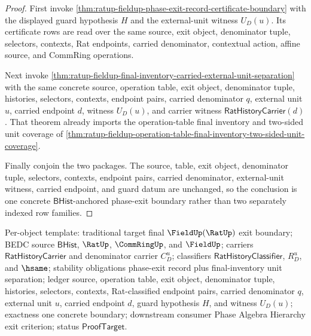 \begin{proof}
First invoke
\autoref{thm:ratup-fieldup-phase-exit-record-certificate-boundary} with the
displayed guard hypothesis $H$ and the external-unit witness $U_D(u)$. Its
certificate rows are read over the same source, exit object, denominator tuple,
selectors, contexts, Rat endpoints, carried denominator, contextual action,
affine source, and CommRing operations.

Next invoke
\autoref{thm:ratup-fieldup-final-inventory-carried-external-unit-separation}
with the same concrete source, operation table, exit object, denominator tuple,
histories, selectors, contexts, endpoint pairs, carried denominator $q$,
external unit $u$, carried endpoint $d$, witness $U_D(u)$, and carrier witness
$\mathsf{RatHistoryCarrier}(d)$. That theorem already imports the
operation-table final inventory and two-sided unit coverage of
\autoref{thm:ratup-fieldup-operation-table-final-inventory-two-sided-unit-coverage}.

Finally conjoin the two packages. The source, table, exit object, denominator
tuple, selectors, contexts, endpoint pairs, carried denominator, external-unit
witness, carried endpoint, and guard datum are unchanged, so the conclusion is
one concrete $\mathsf{BHist}$-anchored phase-exit boundary rather than two
separately indexed row families.
\end{proof}

Per-object template: traditional target final $\FieldUp(\RatUp)$ exit
boundary; BEDC source $\mathsf{BHist}$, $\RatUp$, $\CommRingUp$, and
$\FieldUp$; carriers $\mathsf{RatHistoryCarrier}$ and denominator carrier
$C_D^u$; classifiers $\mathsf{RatHistoryClassifier}$, $R_D^u$, and $\hsame$;
stability obligations phase-exit record plus final-inventory unit separation;
ledger source, operation table, exit object, denominator tuple, histories,
selectors, contexts, Rat-classified endpoint pairs, carried denominator
$q$, external unit $u$, carried endpoint $d$, guard hypothesis $H$, and witness
$U_D(u)$; exactness one concrete boundary; downstream consumer Phase Algebra
Hierarchy exit criterion; status $\mathsf{ProofTarget}$.
